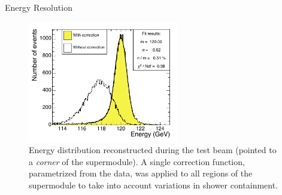 \documentclass[10pt]{beamer}
\begin{document}
\begin{frame}{Energy Resolution}
    \begin{figure}
        \centering
        \includegraphics[height=150pt]{./img/resolution_2.png}
        \caption{Energy distribution reconstructed during the test beam (pointed to a \emph{corner} of the supermodule). A single correction function, parametrized from the data, was applied to all regions of the supermodule to take into account variations in shower containment.}
        \label{fig:res2}
    \end{figure}{}
\end{frame}
\end{document}
